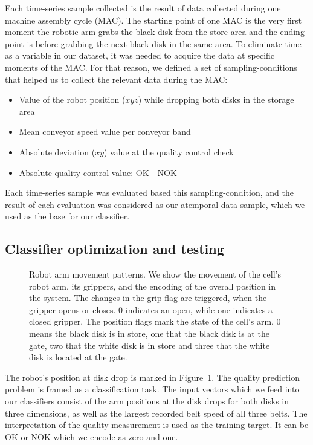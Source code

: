 \documentclass[5p,times,procedia]{elsarticle}
\begin{document}
Each time-series sample collected is the result of data collected during one machine assembly cycle (MAC). The starting point of one MAC is the very first moment the robotic arm grabs the black disk from the store area and the ending point is before grabbing the next black disk in the same area.
To eliminate time as a variable in our dataset, it was needed to acquire the data at specific moments of the MAC. For that reason, we defined a set of sampling-conditions that helped us to collect the relevant data during the MAC:
\begin{itemize}
       \item Value of the robot position ($xyz$) while dropping both disks in the storage area
       \item Mean conveyor speed value per conveyor band
       \item Absolute deviation ($xy$) value at the quality control check
       \item Absolute quality control value: OK - NOK
\end{itemize}

Each time-series sample was evaluated based this sampling-condition, and the result of each evaluation was considered as our atemporal data-sample, which we used as the base for our classifier.

\subsection{Classifier optimization and testing}\label{sec:ml_exp}

\begin{figure}
       
       \caption{Robot arm movement patterns. We show the movement of the 
                cell's robot arm, its grippers, and the encoding of the overall
                position in the system. The changes in the grip flag are triggered,
                when the gripper opens or closes. 0 indicates an open, while
                one indicates a closed gripper. The position flags mark the state
                of the cell's arm. 0 means the black disk is in store,
                one that the black disk is at the gate, two that the white disk
                is in store and three that the white disk is located at the gate.
             }
\label{fig:robot_pos_cell}
\end{figure}

The robot's position at disk drop is marked in 
Figure~\ref{fig:robot_pos_cell}. The quality prediction problem is 
framed as a classification task. The input vectors which we feed into our
classifiers consist of the arm positions at the disk drops for both
disks in three dimensions, as well as the largest recorded belt speed
of all three belts. The interpretation of the quality measurement is 
used as the training target. It can be OK or NOK which we encode as 
zero and one.
\end{document}
